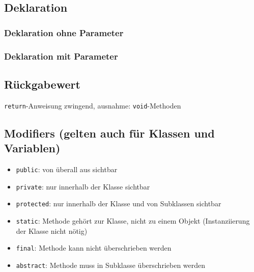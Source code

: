 \subsection{Deklaration}
\vspace{-2mm}
\begin{minipage}[t]{0.44\columnwidth}
    \subsubsection{Deklaration ohne Parameter}
    
\end{minipage}\hfill
\begin{minipage}[t]{0.55\columnwidth}
    \subsubsection{Deklaration mit Parameter}
    
\end{minipage}

\subsection{Rückgabewert}
\lstinline{return}-Anweisung zwingend, ausnahme: \lstinline{void}-Methoden

\subsection{Modifiers (gelten auch für Klassen und Variablen)}
\begin{itemize}
    \item \lstinline{public}: von überall aus sichtbar
    \item \lstinline{private}: nur innerhalb der Klasse sichtbar
    \item \lstinline{protected}: nur innerhalb der Klasse und von Subklassen sichtbar
    \item \lstinline{static}: Methode gehört zur Klasse, nicht zu einem Objekt (Instanziierung der Klasse nicht nötig)
    \item \lstinline{final}: Methode kann nicht überschrieben werden
    \item \lstinline{abstract}: Methode muss in Subklasse überschrieben werden
\end{itemize}
